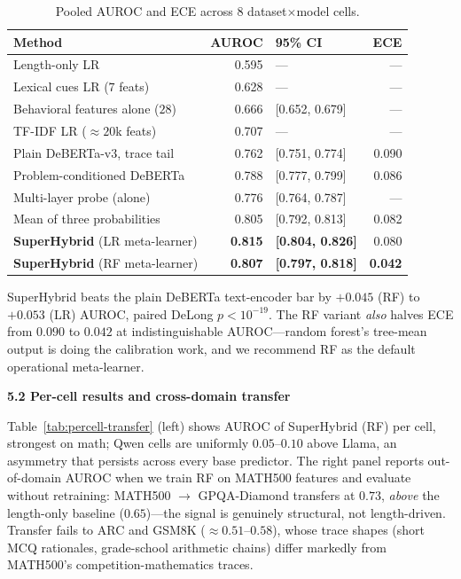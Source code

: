 \documentclass{article}
\begin{document}
\begin{table}[!htbp]
\scriptsize
\caption{Pooled AUROC and ECE across $8$ dataset$\times$model cells.}
\label{tab:pooled}
\centering
\footnotesize
\begin{tabular}{lrlr}
\toprule
Method & AUROC & 95\% CI & ECE \\
\midrule
Length-only LR                          & 0.595 & ---             & ---   \\
Lexical cues LR ($7$ feats)             & 0.628 & ---             & ---   \\
Behavioral features alone ($28$)        & 0.666 & [0.652, 0.679]  & ---   \\
TF-IDF LR ($\approx\!20$k feats)        & 0.707 & ---             & ---   \\
Plain DeBERTa-v3, trace tail            & 0.762 & [0.751, 0.774]  & 0.090 \\
Problem-conditioned DeBERTa             & 0.788 & [0.777, 0.799]  & 0.086 \\
Multi-layer probe (alone)               & 0.776 & [0.764, 0.787]  & ---   \\
Mean of three probabilities             & 0.805 & [0.792, 0.813]  & 0.082 \\
\textbf{SuperHybrid} (LR meta-learner)  & \textbf{0.815} & \textbf{[0.804, 0.826]} & 0.080 \\
\textbf{SuperHybrid} (RF meta-learner)  & \textbf{0.807} & \textbf{[0.797, 0.818]} & \textbf{0.042} \\
\bottomrule
\end{tabular}
\end{table}

SuperHybrid beats the plain DeBERTa text-encoder bar by $+0.045$ (RF) to
$+0.053$ (LR) AUROC, paired DeLong $p < 10^{-19}$. The RF variant \emph{also}
halves ECE from $0.090$ to $0.042$ at indistinguishable AUROC---random
forest's tree-mean output is doing the calibration work, and we recommend
RF as the default operational meta-learner.

\textbf{5.2 Per-cell results and cross-domain transfer}

Table~\ref{tab:percell-transfer} (left) shows AUROC of SuperHybrid (RF) per
cell, strongest on math; Qwen cells are uniformly $0.05$--$0.10$ above
Llama, an asymmetry that persists across every base predictor. The right
panel reports out-of-domain AUROC when we train RF on MATH500 features and
evaluate without retraining: MATH500 $\to$ GPQA-Diamond transfers at
$0.73$, \emph{above} the length-only baseline ($0.65$)---the signal is
genuinely structural, not length-driven. Transfer fails to ARC and GSM8K
($\approx 0.51$--$0.58$), whose trace shapes (short MCQ rationales,
grade-school arithmetic chains) differ markedly from MATH500's
competition-mathematics traces.
\end{document}
